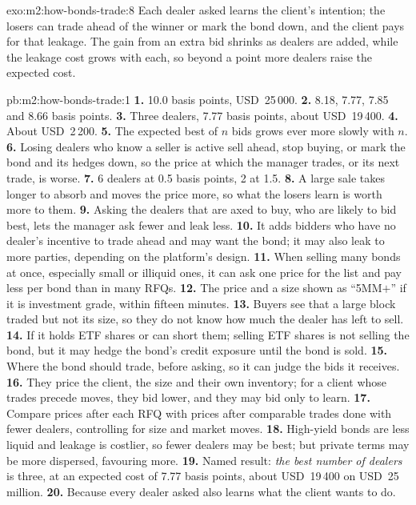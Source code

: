 \begin{solution}{exo:m2:how-bonds-trade:8}
Each dealer asked learns the client's intention; the losers can trade ahead of the
winner or mark the bond down, and the client pays for that leakage. The gain from an
extra bid shrinks as dealers are added, while the leakage cost grows with each, so
beyond a point more dealers raise the expected cost.
\end{solution}

\begin{solution}{pb:m2:how-bonds-trade:1}
\textbf{1.} 10.0 basis points, USD~25\,000.
\textbf{2.} 8.18, 7.77, 7.85 and 8.66 basis points.
\textbf{3.} Three dealers, 7.77 basis points, about USD~19\,400.
\textbf{4.} About USD~2\,200.
\textbf{5.} The expected best of $n$ bids grows ever more slowly with $n$.
\textbf{6.} Losing dealers who know a seller is active sell ahead, stop buying, or
mark the bond and its hedges down, so the price at which the manager trades, or its
next trade, is worse.
\textbf{7.} 6 dealers at 0.5 basis points, 2 at 1.5.
\textbf{8.} A large sale takes longer to absorb and moves the price more, so what the
losers learn is worth more to them.
\textbf{9.} Asking the dealers that are axed to buy, who are likely to bid best,
lets the manager ask fewer and leak less.
\textbf{10.} It adds bidders who have no dealer's incentive to trade ahead and may
want the bond; it may also leak to more parties, depending on the platform's design.
\textbf{11.} When selling many bonds at once, especially small or illiquid ones, it can
ask one price for the list and pay less per bond than in many RFQs.
\textbf{12.} The price and a size shown as ``5MM$+$'' if it is investment grade, within
fifteen minutes.
\textbf{13.} Buyers see that a large block traded but not its size, so they do not
know how much the dealer has left to sell.
\textbf{14.} If it holds ETF shares or can short them; selling ETF shares is not
selling the bond, but it may hedge the bond's credit exposure until the bond is sold.
\textbf{15.} Where the bond should trade, before asking, so it can judge the bids it
receives.
\textbf{16.} They price the client, the size and their own inventory; for a client whose
trades precede moves, they bid lower, and they may bid only to learn.
\textbf{17.} Compare prices after each RFQ with prices after comparable trades done
with fewer dealers, controlling for size and market moves.
\textbf{18.} High-yield bonds are less liquid and leakage is costlier, so fewer dealers
may be best; but private terms may be more dispersed, favouring more.
\textbf{19.} Named result: \emph{the best number of dealers} is three, at an expected
cost of 7.77 basis points, about USD~19\,400 on USD~25 million.
\textbf{20.} Because every dealer asked also learns what the client wants to do.
\end{solution}

